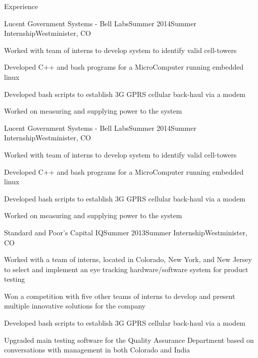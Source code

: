 \documentclass{resume} %
\begin{document}
\begin{rSection}{Experience}
\begin{rSubsection}{Lucent Government Systems - Bell Labs}{Summer 2014}{Summer Internship}{Westminister, CO}
\item Worked with team of interns to develop system to identify valid cell-towers
\item Developed C++ and bash programs for a MicroComputer running embedded linux
\item Developed bash scripts to establish 3G GPRS cellular back-haul via a modem
\item  Worked on measuring and supplying power to the system


\end{rSubsection}

\begin{rSubsection}{Lucent Government Systems - Bell Labs}{Summer 2014}{Summer Internship}{Westminister, CO}
\item Worked with team of interns to develop system to identify valid cell-towers
\item Developed C++ and bash programs for a MicroComputer running embedded linux
\item Developed bash scripts to establish 3G GPRS cellular back-haul via a modem
\item  Worked on measuring and supplying power to the system
\end{rSubsection}


\begin{rSubsection}{Standard and Poor’s Capital IQ}{Summer 2013}{Summer Internship}{Westminister, CO}
\item Worked with a team of interns, located in Colorado, New York, and New Jersey to select and
implement an eye tracking hardware/software system for product testing
\item Won a competition with five other teams of interns to develop and present multiple innovative
solutions for the company
\item Developed bash scripts to establish 3G GPRS cellular back-haul via a modem
\item  Upgraded main testing software for the Quality Assurance Department based on conversations
with management in both Colorado and India
\end{rSubsection}

\end{rSection}
\end{document}
